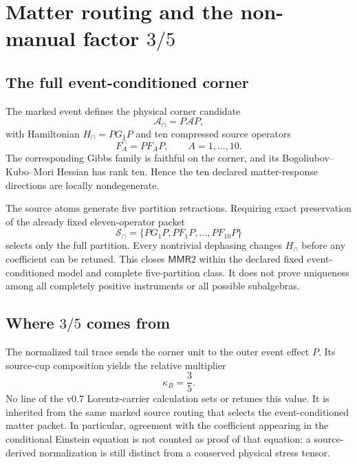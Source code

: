 \documentclass[11pt]{article}
\theoremstyle{definition}
\theoremstyle{remark}
\newcommand{\cA}{\mathcal{A}}
\newcommand{\cS}{\mathcal{S}}
\newcommand{\MMR}{\mathsf{MMR}}
\begin{document}
\section{Matter routing and the non-manual factor $3/5$}

\subsection{The full event-conditioned corner}

The marked event defines the physical corner candidate
\begin{equation}
 \cA_{\cap}=P\cA P,
\end{equation}
with Hamiltonian $H_{\cap}=PG_1P$ and ten compressed source operators
\begin{equation}
 F_A^{\cap}=PF_AP,\qquad A=1,\ldots,10.
\end{equation}
The corresponding Gibbs family is faithful on the corner, and its Bogoliubov--Kubo--Mori Hessian has rank ten. Hence the ten declared matter-response directions are locally nondegenerate.

The source atoms generate five partition retractions. Requiring exact preservation of the already fixed eleven-operator packet
\begin{equation}
 \cS_{\cap}=\{PG_1P,PF_1P,\ldots,PF_{10}P\}
\end{equation}
selects only the full partition. Every nontrivial dephasing changes $H_{\cap}$ before any coefficient can be retuned. This closes $\MMR2$ within the declared fixed event-conditioned model and complete five-partition class. It does not prove uniqueness among all completely positive instruments or all possible subalgebras.

\subsection{Where $3/5$ comes from}

The normalized tail trace sends the corner unit to the outer event effect $P$. Its source-cup composition yields the relative multiplier
\begin{equation}
 \kappa_B=\frac35.
\end{equation}
No line of the v0.7 Lorentz-carrier calculation sets or retunes this value. It is inherited from the same marked source routing that selects the event-conditioned matter packet. In particular, agreement with the coefficient appearing in the conditional Einstein equation is not counted as proof of that equation: a source-derived normalization is still distinct from a conserved physical stress tensor.
\end{document}
